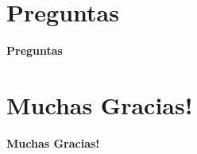 \section{Preguntas}
\begin{frame}
    \Huge
    \centering
    \textbf{Preguntas}

\end{frame}
\section{Muchas Gracias!}
\begin{frame}
    \Huge
    \centering
    \textbf{Muchas Gracias!}

\end{frame}



              